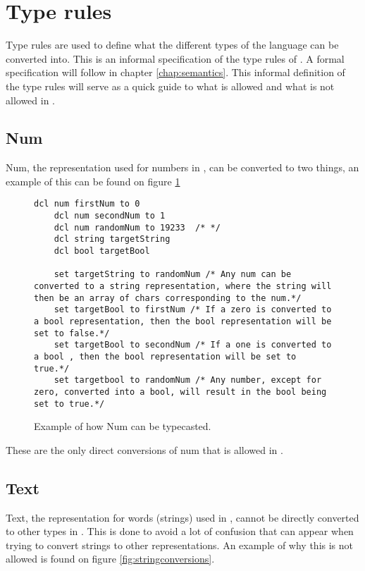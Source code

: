 \section{Type rules}
Type rules are used to define what the different types of the language can be converted into. This is an informal specification of the type rules of \lang{}. A formal specification will follow in chapter \ref{chap:semantics}. This informal definition of the type rules will serve as a quick guide to what is allowed and what is not allowed in \lang{}.

\subsection{Num}
Num, the representation used for numbers in \lang{}, can be converted to two things, an example of this can be found on figure \ref{fig:numconvertions}

\begin{figure}[H]
    \centering
    \begin{lstlisting}[style=gglang]
    dcl num firstNum to 0
    dcl num secondNum to 1
    dcl num randomNum to 19233  /* */
    dcl string targetString
    dcl bool targetBool
    
    set targetString to randomNum /* Any num can be converted to a string representation, where the string will then be an array of chars corresponding to the num.*/
    set targetBool to firstNum /* If a zero is converted to a bool representation, then the bool representation will be set to false.*/
    set targetBool to secondNum /* If a one is converted to a bool , then the bool representation will be set to true.*/
    set targetbool to randomNum /* Any number, except for zero, converted into a bool, will result in the bool being set to true.*/
    \end{lstlisting}
    \caption{Example of how Num can be typecasted.}
    \label{fig:numconvertions}
\end{figure}

These are the only direct conversions of num that is allowed in \lang{}. 

\subsection{Text}
Text, the representation for words (strings) used in \lang{}, cannot be directly converted to other types in \lang{}. This is done to avoid a lot of confusion that can appear when trying to convert strings to other representations. An example of why this is not allowed is found on figure \ref{fig:stringconversions}.

